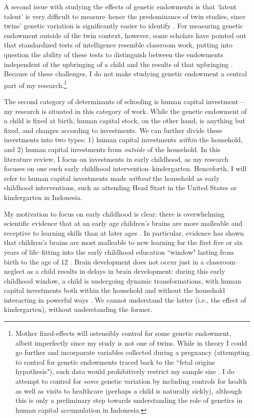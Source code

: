 A second issue with studying the effects of genetic endowments is that `latent talent' is very difficult to measure--hence the predominance of twin studies, since twins’ genetic variation is significantly easier to identify \citep{Miller2001}. For measuring genetic endowment outside of the twin context, however, some scholars have pointed out that standardized tests of intelligence resemble classroom work, putting into question the ability of these tests to distinguish between the endowments independent of the upbringing of a child and the results of that upbringing \citep{Johnson2009}. Because of these challenges, I do not make studying genetic endowment a central part of my research.\footnote{Mother fixed-effects will ostensibly control for some genetic endowment, albeit imperfectly since my study is not one of twins. While in theory I could go further and incorporate variables collected during a pregnancy (attempting to control for genetic endowments traced back to the ``fetal origins hypothesis"), such data would prohibitively restrict my sample size \citep{Almond2011}. I do attempt to control for \textit{some} genetic variation by including controls for health as well as visits to healthcare (perhaps a child is naturally sickly), although this is only a preliminary step towards understanding the role of genetics in human capital accumulation in Indonesia.}

The second category of determinants of schooling is human capital investment—my research is situated in this category of work. While the genetic endowment of a child is fixed at birth, human capital stock, on the other hand, is anything but fixed, and changes according to investments. We can further divide these investments into two types: 1) human capital investments \textit{within} the household, and 2) human capital investments from \textit{outside} of the household. In this literature review, I focus on investments in early childhood, as my research focuses on one such early childhood intervention--kindergarten. Henceforth, I will refer to human capital investments made \textit{without} the household as early childhood interventions, such as attending Head Start in the United States or kindergarten in Indonesia.

My motivation to focus on early childhood is clear: there is overwhelming scientific evidence that at an early age children's brains are more malleable and receptive to learning skills than at later ages \citep{Cantor2019,Duncan2023}. In particular, evidence has shown that children's brains are most malleable to new learning for the first five or six years of life--fitting into the early childhood education ``window" lasting from birth to the age of 12 \citep{Slegers1997}. Brain development does not occur just in a classroom--neglect as a child results in delays in brain development: during this early childhood window, a child is undergoing dynamic transformations, with human capital investments both within the household and without the household interacting in powerful ways \citep{Perry1997}. We cannot understand the latter (i.e., the effect of kindergarten), without understanding the former.

